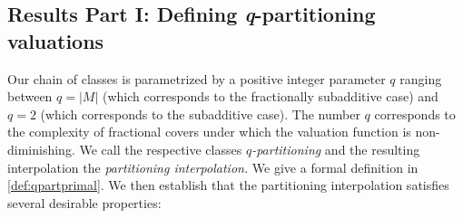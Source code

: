 \documentclass[11pt]{article}\usepackage{amsfonts}
\numberwithin{theorem}{subsection}
\def\hmath$#1${\texorpdfstring{{\rmfamily\textit{#1}}}{#1}}
\begin{document}
\subsection{Results Part I: Defining \hmath$q$-partitioning valuations}

Our chain of classes is parametrized by a positive integer parameter $q$ ranging between $q= |M|$ (which corresponds to the fractionally subadditive case) and $q = 2$ (which corresponds to the subadditive case). The number $q$ corresponds to the complexity of fractional covers under which the valuation function is non-diminishing. We call the respective classes \textit{$q$-partitioning} and the resulting interpolation the \textit{partitioning interpolation.} We give a formal definition in \cref{def:qpartprimal}. We then establish that the partitioning interpolation satisfies several desirable properties:
\end{document}
